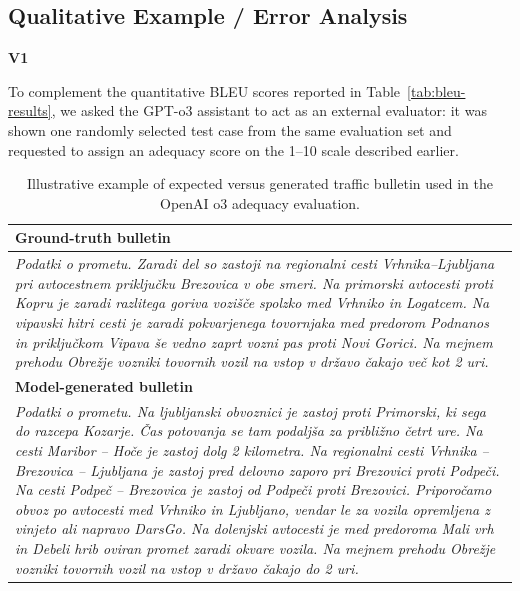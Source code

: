 \documentclass[fleqn,moreauthors,10pt]{ds_report}
\begin{document}
\subsection{Qualitative Example / Error Analysis}
\label{subsec:qualitative}

\vspace{1em} %
\noindent \textbf{V1}
\vspace{0.5em} %

To complement the quantitative BLEU scores reported in Table~\ref{tab:bleu-results}, we asked the GPT\mbox{-}o3 assistant to act as an external evaluator: it was shown one randomly selected test case from the same evaluation set and requested to assign an adequacy score on the 1–10 scale described earlier.


\begin{table}[ht]
\centering
\footnotesize                    %
\renewcommand{\arraystretch}{1.15}
\setlength{\tabcolsep}{4pt}
\begin{tabularx}{\linewidth}{@{}X@{}}
\toprule
\textbf{Ground-truth bulletin} \\  %
\midrule
\textit{Podatki o prometu. Zaradi del so zastoji na regionalni cesti Vrhnika–Ljubljana pri avtocestnem priključku Brezovica v obe smeri. Na primorski avtocesti proti Kopru je zaradi razlitega goriva vozišče spolzko med Vrhniko in Logatcem. Na vipavski hitri cesti je zaradi pokvarjenega tovornjaka med predorom Podnanos in priključkom Vipava še vedno zaprt vozni pas proti Novi Gorici. Na mejnem prehodu Obrežje vozniki tovornih vozil na vstop v državo čakajo več kot 2 uri.} \\[0.8em] %
\midrule

\textbf{Model-generated bulletin} \\  %
\midrule
\textit{Podatki o prometu. Na ljubljanski obvoznici je zastoj proti Primorski, ki sega do razcepa Kozarje. Čas potovanja se tam podaljša za približno četrt ure. Na cesti Maribor – Hoče je zastoj dolg 2 kilometra. Na regionalni cesti Vrhnika – Brezovica – Ljubljana je zastoj pred delovno zaporo pri Brezovici proti Podpeči. Na cesti Podpeč – Brezovica je zastoj od Podpeči proti Brezovici. Priporočamo obvoz po avtocesti med Vrhniko in Ljubljano, vendar le za vozila opremljena z vinjeto ali napravo DarsGo. Na dolenjski avtocesti je med predoroma Mali vrh in Debeli hrib oviran promet zaradi okvare vozila. Na mejnem prehodu Obrežje vozniki tovornih vozil na vstop v državo čakajo do 2 uri.} \\
\bottomrule
\end{tabularx}
\caption{Illustrative example of expected versus generated traffic bulletin used in the OpenAI o3 adequacy evaluation.}
\label{tab:qualitative}
\end{table}
\end{document}
